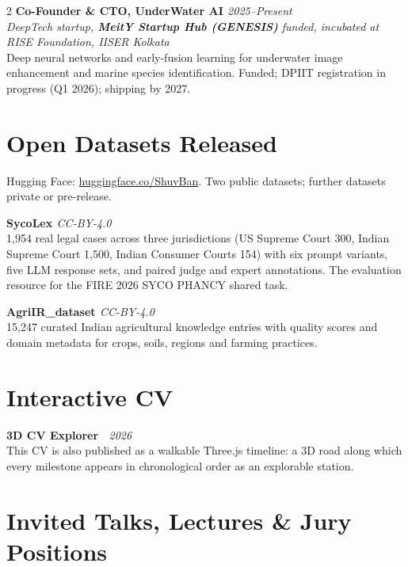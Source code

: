\documentclass[a4paper,10.5pt]{extarticle}
\newcommand{\entry}[3]{%
  {\normalsize\textbf{#1}}\hfill{\small\itshape\textcolor{mutedtext}{#2}}\\[0.04em]
  {\small #3}\par\vspace{3pt}%
}
\newcommand{\entryv}[4]{%
  {\normalsize\textbf{#1}}\hfill{\small\itshape\textcolor{mutedtext}{#2}}\\[0.04em]
  {\small\itshape\textcolor{mutedtext}{#3}}\\[0.04em]
  {\small #4}\par\vspace{3pt}%
}
\begin{document}
\begin{paracol}{2}
\entryv{Co-Founder \& CTO, UnderWater AI \href{https://underwater-ai.github.io/}{\faGlobe}}{2025--Present}{DeepTech startup, \textbf{MeitY Startup Hub (GENESIS)} funded, incubated at RISE Foundation, IISER Kolkata}{%
Deep neural networks and early-fusion learning for underwater image enhancement and marine species identification. Funded; DPIIT registration in progress (Q1 2026); shipping by 2027.}

\section{Open Datasets Released}

{\small Hugging Face: \href{https://huggingface.co/ShuvBan}{huggingface.co/ShuvBan}. Two public datasets; further datasets private or pre-release.}\par\vspace{3.5pt}

\entry{SycoLex \href{https://huggingface.co/datasets/ShuvBan/SycoLex}{\faDatabase}}{CC-BY-4.0}{%
1,954 real legal cases across three jurisdictions (US Supreme Court 300, Indian Supreme Court 1,500, Indian Consumer Courts 154) with six prompt variants, five LLM response sets, and paired judge and expert annotations. The evaluation resource for the FIRE 2026 SYCO PHANCY shared task.}

\entry{AgriIR\_dataset \href{https://huggingface.co/datasets/ShuvBan/AgriIR_dataset}{\faDatabase}}{CC-BY-4.0}{%
15,247 curated Indian agricultural knowledge entries with quality scores and domain metadata for crops, soils, regions and farming practices.}

\section{Interactive CV}

\entry{3D CV Explorer \href{https://github.com/Shuvam-Banerji-Seal/My-CV}{\faGithub}~\href{https://shuvam-banerji-seal.github.io/My-CV/}{\faGlobe}}{2026}{%
This CV is also published as a walkable Three.js timeline: a 3D road along which every milestone appears in chronological order as an explorable station.}

\switchcolumn

\section{Invited Talks, Lectures \& Jury Positions}


\end{paracol}
\end{document}

